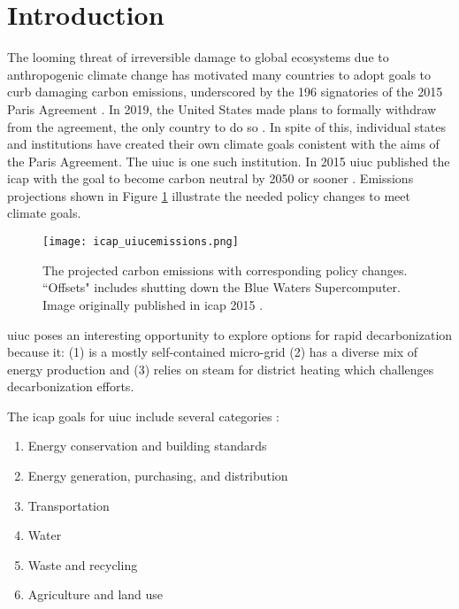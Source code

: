 \section{Introduction}






The looming threat of irreversible damage to global ecosystems due to
anthropogenic climate change has motivated many countries to adopt goals to
curb damaging carbon emissions, underscored by the 196 signatories of the 2015
Paris Agreement \cite{noauthor_paris_nodate}. In 2019, the United States made
plans to formally withdraw from the agreement, the only country to do so
\cite{eshraghi_us_2018}. In spite of
this, individual states and institutions have created their own climate goals
conistent with the aims of the Paris Agreement. The \gls{uiuc} is one such
institution. In 2015 \gls{uiuc} published the \gls{icap} with the goal to
become carbon neutral by 2050 or sooner \cite{isee_illinois_2015}. Emissions
projections shown in Figure \ref{fig:icap_emissions} illustrate the needed
policy changes to meet climate goals.

\begin{figure}[h]
  \centering
  \texttt{[image: icap\_uiucemissions.png]}
  \caption{The projected carbon emissions with corresponding policy changes.
  ``Offsets" includes shutting down the Blue Waters Supercomputer. Image
  originally published in \gls{icap} 2015 \cite{isee_illinois_2015}.}
  \label{fig:icap_emissions}
\end{figure}

\gls{uiuc} poses an interesting opportunity to explore options for rapid
decarbonization because it: (1) is a mostly self-contained micro-grid (2) has a
diverse mix of energy production and (3) relies on steam for district heating
which challenges decarbonization efforts.


The \gls{icap} goals for \gls{uiuc} include several categories
\cite{isee_illinois_2015}:
\begin{enumerate}
  \item Energy conservation and building standards
  \item Energy generation, purchasing, and distribution
  \item Transportation
  \item Water
  \item Waste and recycling
  \item Agriculture and land use
\end{enumerate}

